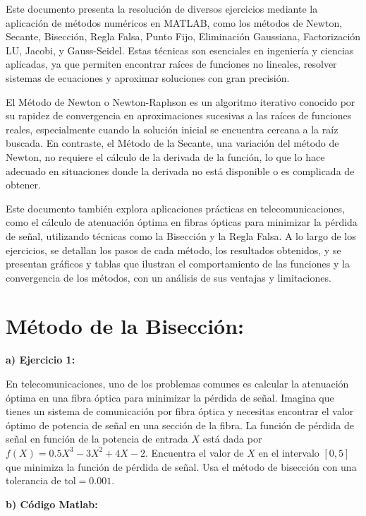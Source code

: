 \documentclass[12pt,a4paper,twoside]{article}  %
\begin{document}
Este documento presenta la resolución de diversos ejercicios mediante la aplicación de métodos numéricos en MATLAB, como los métodos de Newton, Secante, Bisección, Regla Falsa, Punto Fijo, Eliminación Gaussiana, Factorización LU, Jacobi, y Gauss-Seidel. Estas técnicas son esenciales en ingeniería y ciencias aplicadas, ya que permiten encontrar raíces de funciones no lineales, resolver sistemas de ecuaciones y aproximar soluciones con gran precisión.

El Método de Newton o Newton-Raphson es un algoritmo iterativo conocido por su rapidez de convergencia en aproximaciones sucesivas a las raíces de funciones reales, especialmente cuando la solución inicial se encuentra cercana a la raíz buscada. En contraste, el Método de la Secante, una variación del método de Newton, no requiere el cálculo de la derivada de la función, lo que lo hace adecuado en situaciones donde la derivada no está disponible o es complicada de obtener.

Este documento también explora aplicaciones prácticas en telecomunicaciones, como el cálculo de atenuación óptima en fibras ópticas para minimizar la pérdida de señal, utilizando técnicas como la Bisección y la Regla Falsa. A lo largo de los ejercicios, se detallan los pasos de cada método, los resultados obtenidos, y se presentan gráficos y tablas que ilustran el comportamiento de las funciones y la convergencia de los métodos, con un análisis de sus ventajas y limitaciones.



\newpage

\section{Método de la Bisección:}

\textbf{a) Ejercicio 1: }

En telecomunicaciones, uno de los problemas comunes es calcular la atenuación óptima en una fibra óptica para minimizar la pérdida de señal. Imagina que tienes un sistema de comunicación por fibra óptica y necesitas encontrar el valor óptimo de potencia de señal en una sección de la fibra. La función de pérdida de señal en función de la potencia de entrada \(X\) está dada por \(f(X) = 0.5X^3 - 3X^2 + 4X - 2\). Encuentra el valor de \(X\) en el intervalo \([0, 5]\) que minimiza la función de pérdida de señal. Usa el método de bisección con una tolerancia de \( \text{tol} = 0.001 \).


\textbf{b) Código Matlab:}
\end{document}
